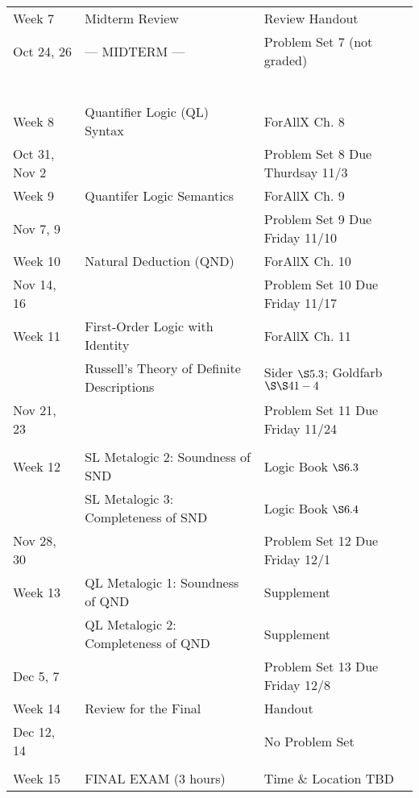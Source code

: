 \documentclass[letterpaper]{inzane_syllabus} %
\begin{document}
\begin{center}
\begin{tabularx}{\textwidth}{p{2.5cm}p{8cm}p{9cm}}
Week 7 & Midterm Review & Review Handout \\
Oct 24, 26 & --- MIDTERM --- &  Problem Set 7 (not graded) \\
~\\

\arrayrulecolor{myCOLOR}\hline

\multicolumn{2}{l}{\textbf{\textcolor{myCOLOR}{\large Part 2: Quantifer Logic (QL) }}} \\
\hline

Week 8 & Quantifier Logic (QL) Syntax & ForAllX Ch. 8 \\
Oct 31, Nov 2 & & Problem Set 8 Due Thurdsay 11/3 \\
\arrayrulecolor{maingray}\hline
 
Week 9 & Quantifer Logic Semantics & ForAllX Ch. 9 \\
Nov 7, 9 & & Problem Set 9 Due Friday 11/10 \\
\arrayrulecolor{maingray}\hline

Week 10 & Natural Deduction (QND) & ForAllX Ch. 10 \\
Nov 14, 16 & & Problem Set 10 Due Friday 11/17 \\
\arrayrulecolor{maingray}\hline

Week 11 & First-Order Logic with Identity & ForAllX Ch. 11 \\
& Russell's Theory of Definite Descriptions & Sider $\S 5.3$; Goldfarb $\S\S 41-4$ \\
Nov 21, 23 & & Problem Set 11 Due Friday 11/24 \\
\arrayrulecolor{maingray}\hline

\multicolumn{2}{l}{\textbf{\textcolor{myCOLOR}{\large Part 3: Metalogic }}} \\
\hline

Week 12 & SL Metalogic 2: Soundness of SND & Logic Book $\S6.3$ \\
& SL Metalogic 3: Completeness of SND & Logic Book $\S6.4$ \\
Nov 28, 30 & & Problem Set 12 Due Friday 12/1 \\
\arrayrulecolor{maingray}\hline

Week 13 & QL Metalogic 1: Soundness of QND & Supplement \\
& QL Metalogic 2: Completeness of QND & Supplement \\
Dec 5, 7 & & Problem Set 13 Due Friday 12/8 \\
\arrayrulecolor{maingray}\hline

Week 14 & Review for the Final & Handout \\
Dec 12, 14 & & No Problem Set \\

\arrayrulecolor{maingray}\hline\\

\arrayrulecolor{myCOLOR}\hline
Week 15 & FINAL EXAM (3 hours) & Time \& Location TBD \\ 
\hline 
\end{tabularx}
\end{center}


\end{document}
